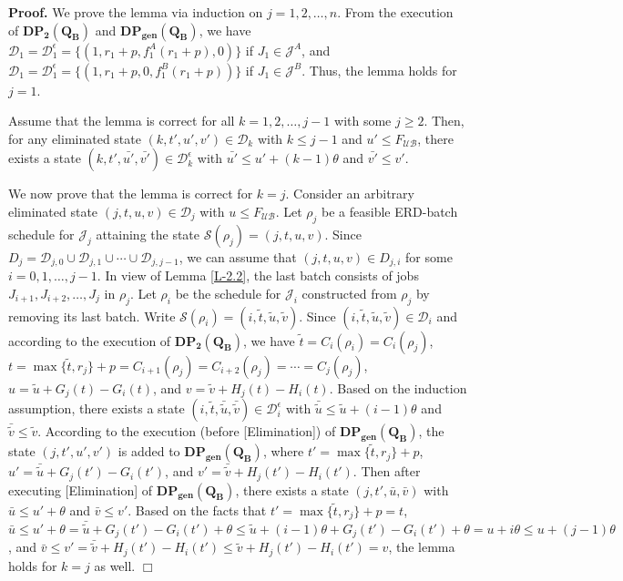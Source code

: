 \documentclass[12pt]{article}
\begin{document}
\begin{sloppypar}
\noindent\textbf{Proof.} We prove the lemma via induction on $j=1, 2, \ldots, n$. From the execution of $\mathbf{DP_2(Q_B)}$ and $\mathbf{DP_{gen}(Q_B)}$, we have $\mathcal{D}_1=\mathcal{D}_1^{\epsilon}=\{(1, r_1+p, f_1^A(r_1+p), 0)\}$ if $J_1 \in \mathcal{J}^A$, and $\mathcal{D}_1=\mathcal{D}_1^{\epsilon}=\{(1, r_1+p,  0, f_1^B(r_1+p))\}$ if $J_1 \in \mathcal{J}^B$.
Thus, the lemma holds for $j=1$.

Assume that the lemma is correct for all $k=1, 2, \ldots, j-1$ with some $j \geq 2$. Then, 
for any eliminated state $(k, t', u', v') \in \mathcal{D}_k$ with $k \leq j-1$ and $u' \leq F_{\mathcal{UB}}$, there exists a state $(k, t', \bar{u'}, \bar{v'}) \in \mathcal{D}_k^{\epsilon}$ with $\bar{u'} \leq u'+(k-1)\theta$ and $\bar{v'} \leq v'$.

We now prove that the lemma is correct for $k=j$. Consider an arbitrary eliminated state $(j, t, u, v) \in \mathcal{D}_j$ with $u \leq F_{\mathcal{UB}}$. Let $\rho_j$ be a feasible ERD-batch schedule for $\mathcal{J}_j$ attaining the state $\mathcal{S}(\rho_j)=(j, t, u, v)$. Since $D_j=\mathcal{D}_{j,0} \cup \mathcal{D}_{j,1} \cup \cdots \cup \mathcal{D}_{j,j-1}$, we can assume that $(j, t, u, v) \in D_{j,i}$ for some $i=0, 1, \ldots, j-1$.
In view of Lemma \ref{L-2.2}, the last batch consists of jobs $J_{i+1}, J_{i+2}, \ldots, J_j$ in $\rho_j$. Let $\rho_i$ be the schedule for $\mathcal{J}_i$ constructed from $\rho_j$ by removing  its last batch. Write $\mathcal{S}(\rho_i)=(i, \tilde{t}, \tilde{u}, \tilde{v})$. Since $(i, \tilde{t}, \tilde{u}, \tilde{v}) \in \mathcal{D}_i$ and according to the execution of $\mathbf{DP_2(Q_B)}$, we have $\tilde{t}=C_i(\rho_i)=C_i(\rho_j)$,
$t=\max \{\tilde{t}, r_j\}+p = C_{i+1}(\rho_j)=C_{i+2}(\rho_j)=\cdots=C_j(\rho_j)$,
$u=\tilde{u}+G_j(t)-G_i(t)$, and $v=\tilde{v}+H_j(t)-H_i(t)$. Based on the induction assumption,
there exists a state $(i, \tilde{t}, \bar{\tilde{u}}, \bar{\tilde{v}}) \in \mathcal{D}_i^{\epsilon}$ with
$\bar{\tilde{u}} \leq \tilde{u}+(i-1)\theta$ and $\bar{\tilde{v}} \leq \tilde{v}$.
According to the execution (before [Elimination]) of $\mathbf{DP_{gen}(Q_B)}$, the state
$(j, t', u', v')$ is added to $\mathbf{DP_{gen}(Q_B)}$, where $t'=\max \{\tilde{t}, r_j\}+p$,
$u'=\bar{\tilde{u}}+G_j(t')-G_i(t')$, and $v'=\bar{\tilde{v}}+H_j(t')-H_i(t')$.
Then after executing [Elimination] of $\mathbf{DP_{gen}(Q_B)}$, there exists a
state $(j, t', \bar{u}, \bar{v})$ with $\bar{u} \leq u'+\theta$ and $\bar{v} \leq v'$.
Based on the facts that $t'=\max \{\tilde{t}, r_j\}+p=t$, $\bar{u} \leq u'+\theta=\bar{\tilde{u}}+G_j(t')-G_i(t')+\theta
\leq \tilde{u}+(i-1)\theta+G_j(t')-G_i(t')+\theta=u+i \theta \leq u+ (j-1) \theta$, and $\bar{v} \leq v'=\bar{\tilde{v}}+H_j(t')-H_i(t') \leq \tilde{v}+H_j(t')-H_i(t')=v$, the lemma holds for $k=j$ as well. \hfill$\Box$


\end{sloppypar}
\end{document}

